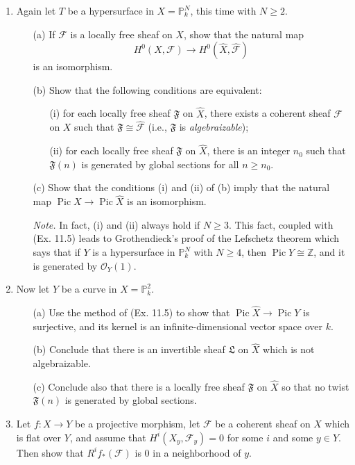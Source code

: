 \documentclass{article}
\newcommand{\goth}[1]{\mathfrak{#1}}
\newcommand{\fF}{\mathscr{F}}
\newcommand{\fO}{\mathscr{O}}
\newcommand{\PP}{\mathbb{P}}
\newcommand{\Z}{\mathbb{Z}}
\DeclareMathOperator{\pic}{Pic}
\begin{document}
\begin{enumerate} [label=\textbf{\arabic*.}, leftmargin=0em]
\item Again let $T$ be a hypersurface in $X = \PP_k^N$, this time with $N \geq 2$.
\begin{itemize}
  \item[(a)] If $\fF$ is a locally free sheaf on $X$, show that the natural map
  \begin{equation*}
    H^0(X, \fF) \to H^0(\hat{X}, \hat{\fF})
  \end{equation*}
  is an isomorphism.
  \item[(b)] Show that the following conditions are equivalent:
  \begin{itemize}
    \item[(i)] for each locally free sheaf $\goth{F}$ on $\hat{X}$, there exists a coherent sheaf $\fF$ on $X$ such that $\goth{F} \cong \hat{\fF}$ (i.e., $\goth{F}$ is \textit{algebraizable});
    \item[(ii)] for each locally free sheaf $\goth{F}$ on $\hat{X}$, there is an integer $n_0$ such that $\goth{F}(n)$ is generated by global sections for all $n \geq n_0$.
  \end{itemize}
  \item[(c)] Show that the conditions (i) and (ii) of (b) imply that the natural map $\pic{X} \to \pic{\hat{X}}$ is an isomorphism.

  \textit{Note.} In fact, (i) and (ii) always hold if $N \geq 3$. This fact, coupled with (Ex. 11.5) leads to Grothendieck's proof of the Lefschetz theorem which says that if $Y$ is a hypersurface in $\PP_k^N$ with $N \geq 4$, then $\pic{Y} \cong \Z$, and it is generated by $\fO_Y(1)$.
\end{itemize}

\item Now let $Y$ be a curve in $X = \PP_k^2$.
\begin{itemize}
  \item[(a)] Use the method of (Ex. 11.5) to show that $\pic{\hat{X}} \to \pic{Y}$ is surjective, and its kernel is an infinite-dimensional vector space over $k$.
  \item[(b)] Conclude that there is an invertible sheaf $\goth{L}$ on $\hat{X}$ which is not algebraizable.
  \item[(c)] Conclude also that there is a locally free sheaf $\goth{F}$ on $\hat{X}$ so that no twist $\goth{F}(n)$ is generated by global sections.
\end{itemize}

\item Let $f : X \to Y$ be a projective morphism, let $\fF$ be a coherent sheaf on $X$ which is flat over $Y$, and assume that $H^i(X_y, \fF_y) = 0$ for some $i$ and some $y \in Y$. Then show that $R^if_*(\fF)$ is $0$ in a neighborhood of $y$.

\end{enumerate}
\end{document}
